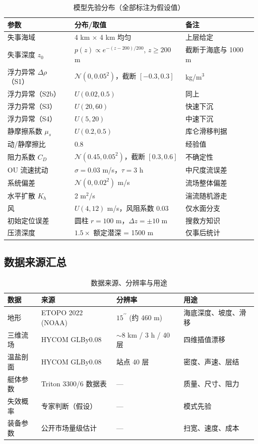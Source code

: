 \begin{table}[H]
\centering\small
\caption{模型先验分布（全部标注为假设值）}
\label{tab:prior}
\begin{tabular}{@{}lll@{}}
\toprule
参数 & 分布/取值 & 备注\\
\midrule
失事海域 & 4 km $\times$ 4 km 均匀 & 上层给定\\
失事深度 $z_0$ & $p(z)\propto e^{-(z-200)/200}$, $z\ge200$ m & 截断于海底与 1000 m\\
浮力异常 $\Delta\rho$（S1） & $\mathcal N(0,0.05^2)$，截断 $[-0.3,0.3]$ & kg/m$^3$\\
浮力异常（S2b） & $U(0.02,0.5)$ & 同上\\
浮力异常（S3） & $U(20,60)$ & 快速下沉\\
浮力异常（S4） & $U(5,20)$ & 中速下沉\\
静摩擦系数 $\mu_s$ & $U(0.2,0.5)$ & 库仑滑移判据\\
动/静摩擦比 & 0.8 & 经验值\\
阻力系数 $C_D$ & $\mathcal N(0.45,0.05^2)$，截断 $[0.3,0.6]$ & 不确定性\\
OU 流速扰动 & $\sigma=0.03$ m/s，$\tau=3$ h & 中尺度流误差\\
系统偏差 & $\mathcal N(0,0.02^2)$ m/s & 流场整体偏差\\
水平扩散 $K_h$ & 2 m$^2$/s & 湍流随机游走\\
风 & $U(4,12)$ m/s，风阻系数 0.03 & 仅水面分支\\
初始定位误差 & 圆柱 $r=100$ m，$\Delta z=\pm10$ m & 搜救方知识\\
压溃深度 & $1.5\times$ 额定潜深 = 1500 m & 仅事后统计\\
\bottomrule
\end{tabular}
\end{table}

\subsection{数据来源汇总}

\begin{table}[H]
\centering\small
\caption{数据来源、分辨率与用途}
\label{tab:data}
\begin{tabular}{@{}llll@{}}
\toprule
数据 & 来源 & 分辨率 & 用途\\
\midrule
地形 & ETOPO 2022 (NOAA) & $15^{\prime\prime}$ (约 460 m) & 海底深度、坡度、滑移\\
三维流场 & HYCOM GLBy0.08 & $\sim$8 km / 3 h / 40 层 & 四维插值漂移\\
温盐剖面 & HYCOM GLBy0.08 & 站点 40 层 & 密度、声速、层结\\
艇体参数 & Triton 3300/6 数据表 & — & 质量、尺寸、阻力\\
失效概率 & 专家判断（假设） & — & 模式先验\\
装备参数 & 公开市场量级估计 & — & 扫宽、速度、成本\\
\bottomrule
\end{tabular}
\end{table}
